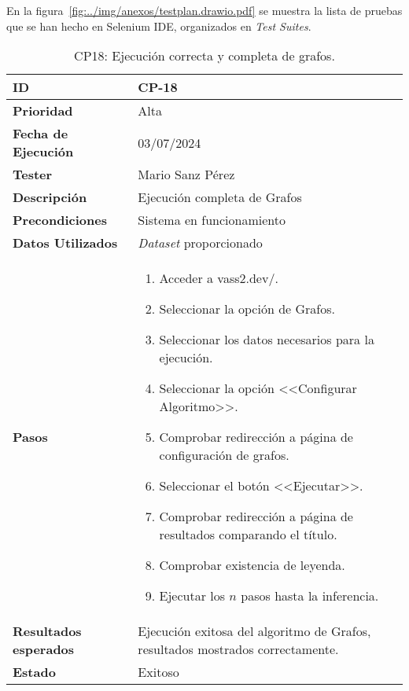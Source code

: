 En la figura~\ref{fig:../img/anexos/testplan.drawio.pdf} se muestra la lista de pruebas que se han hecho en Selenium IDE, organizados en \textit{Test Suites}.


\begin{table}[ht]
	\centering
	\renewcommand{\arraystretch}{1.5} %
	\begin{tabular}{>{\raggedright\arraybackslash}p{4cm} p{9.5cm}}
    \hline
    \rowcolor{gray!20}
    \textbf{ID} & CP-18\\
    \hline
    \rowcolor{white}
    \textbf{Prioridad} & Alta \\
    \hline
    \rowcolor{gray!20}
    \textbf{Fecha de Ejecución} & 03/07/2024 \\
    \hline
    \rowcolor{white}
    \textbf{Tester} & Mario Sanz Pérez \\
    \hline
    \rowcolor{gray!20}
    \textbf{Descripción} & Ejecución completa de Grafos\\
    \hline
    \rowcolor{white}
    \textbf{Precondiciones} & Sistema en funcionamiento\\
    \hline
    \rowcolor{white}
    \textbf{Datos Utilizados} & \textit{Dataset} proporcionado\\
    \hline
    \rowcolor{gray!20}
    \textbf{Pasos} & \begin{enumerate}
        \item Acceder a vass2.dev/.
        \item Seleccionar la opción de Grafos.
        \item Seleccionar los datos necesarios para la ejecución.
        \item Seleccionar la opción <<Configurar Algoritmo>>.
        \item Comprobar redirección a página de configuración de grafos.
        \item Seleccionar el botón <<Ejecutar>>.
        \item Comprobar redirección a página de resultados comparando el título.
        \item Comprobar existencia de leyenda.
        \item Ejecutar los $n$ pasos hasta la inferencia.
    \end{enumerate}\\
	\hline
    \rowcolor{gray!20}
    \textbf{Resultados esperados} & Ejecución exitosa del algoritmo de Grafos, resultados mostrados correctamente.\\
    \hline
    \rowcolor{white}
    \textbf{Estado} & Exitoso\\
    \hline
\end{tabular}
	\caption[CP18: Ejecución Grafos]{CP18: Ejecución correcta y completa de grafos.}
\end{table}

